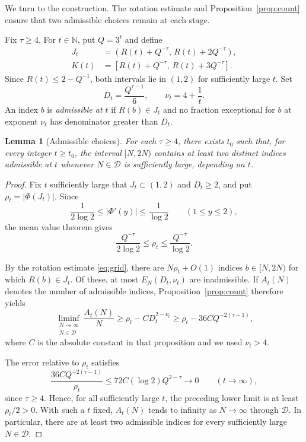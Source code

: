 \documentclass[11pt,reqno]{amsart}
\newtheorem{lemma}{Lemma}[section]
\theoremstyle{definition}
\newcommand{\N}{\mathbb N}
\newcommand{\DD}{\mathcal D}
\begin{document}
We turn to the construction. The rotation estimate
and Proposition~\ref{prop:count} ensure that two
admissible choices remain at each stage.

Fix $\tau\ge4$. For $t\in\N$, put $Q=3^t$ and define
\[
 \begin{aligned}
 J_t&=(R(t)+Q^{-\tau},\,R(t)+2Q^{-\tau}),\\
 K(t)&=[R(t)+Q^{-\tau},\,R(t)+3Q^{-\tau}].
 \end{aligned}
\]
Since $R(t)\le2-Q^{-1}$, both intervals lie in $(1,2)$
for sufficiently large $t$. Set
\[
 D_t=\frac{Q^{\tau-1}}6,\qquad
 \nu_t=4+\frac1t.
\]
An index $b$ is \emph{admissible at $t$} if
$R(b)\in J_t$ and no fraction exceptional for $b$
at exponent $\nu_t$ has denominator greater than $D_t$.

\begin{lemma}[Admissible choices]\label{lem:choice}
For each $\tau\ge4$, there exists $t_0$ such that,
for every integer $t\ge t_0$, the interval $[N,2N)$
contains at least two distinct indices admissible at $t$
whenever $N\in\DD$ is sufficiently large, depending on $t$.
\end{lemma}

\begin{proof}
Fix $t$ sufficiently large that $J_t\subset(1,2)$
and $D_t\ge2$, and put $\rho_t=|\Phi(J_t)|$.
Since
\[
 \frac1{2\log2}\le|\Phi'(y)|
 \le\frac1{\log2}\qquad(1\le y\le2),
\]
the mean value theorem gives
\[
 \frac{Q^{-\tau}}{2\log2}
 \le\rho_t\le\frac{Q^{-\tau}}{\log2}.
\]

By the rotation estimate \eqref{eq:grid}, there are
$N\rho_t+O(1)$ indices $b\in[N,2N)$ for which
$R(b)\in J_t$. Of these, at most $E_N(D_t,\nu_t)$
are inadmissible. If $A_t(N)$ denotes the number
of admissible indices, Proposition~\ref{prop:count}
therefore yields
\[
 \liminf_{\substack{N\to\infty\\N\in\DD}}
 \frac{A_t(N)}N
 \ge\rho_t-CD_t^{2-\nu_t}
 \ge\rho_t-36C Q^{-2(\tau-1)},
\]
where $C$ is the absolute constant in that proposition
and we used $\nu_t>4$.

The error relative to $\rho_t$ satisfies
\[
 \frac{36C Q^{-2(\tau-1)}}{\rho_t}
 \le72C(\log2)Q^{2-\tau}\longrightarrow0
 \qquad(t\to\infty),
\]
since $\tau\ge4$. Hence, for all sufficiently large
$t$, the preceding lower limit is at least
$\rho_t/2>0$. With such a $t$ fixed, $A_t(N)$
tends to infinity as $N\to\infty$ through $\DD$.
In particular, there are at least two admissible
indices for every sufficiently large $N\in\DD$.
\end{proof}
\end{document}
